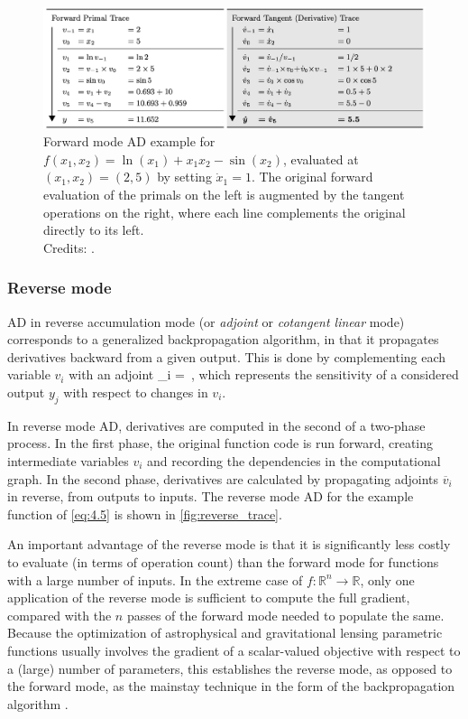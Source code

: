 \begin{figure}
    \centering
    \includegraphics[width=\linewidth]{img//chapter4/forward_trace.png}
    \caption[Forward mode AD example]{Forward mode AD example for $f(x_1, x_2) = \ln{(x_1)} + x_1 x_2 - \sin{(x_2)}$, evaluated at $(x_1, x_2) = (2, 5)$ by setting $\Dot{x}_1 = 1$. The original forward evaluation of the primals on the left is augmented by the tangent operations on the right, where each line complements the original directly to its left.\\\small{Credits: \cite{baydin_automatic_2018}.}}
    \label{fig:forward_trace}
\end{figure}


\subsubsection{Reverse mode}
\label{subsubsec:reverse_mode}
AD in reverse accumulation mode (or \emph{adjoint} or \emph{cotangent linear} mode) \citep{griewank_numerical_2012} corresponds to a generalized backpropagation algorithm, in that it propagates derivatives backward from a given output. This is done by complementing each variable $v_i$ with an adjoint
\be
\label{eq:4.7}
_i =  \,,
\ee
which represents the sensitivity of a considered output $y_j$ with respect to changes in $v_i$.

In reverse mode AD, derivatives are computed in the second of a two-phase process. In the first phase, the original function code is run forward, creating intermediate variables $v_i$ and recording the dependencies in the computational graph. In the second phase, derivatives are calculated by propagating adjoints $\overline{v}_i$ in reverse, from outputs to inputs. The reverse mode AD for the example function of \cref{eq:4.5} is shown in \cref{fig:reverse_trace}.

An important advantage of the reverse mode is that it is significantly less costly to evaluate (in terms of operation count) than the forward mode for functions with a large number of inputs. In the extreme case of $f : \mathbb{R}^n \rightarrow \mathbb{R}$, only one application of the reverse
mode is sufficient to compute the full gradient, compared with the $n$ passes of the forward mode needed to populate the same. Because the optimization of astrophysical and gravitational lensing parametric functions usually involves the gradient of a scalar-valued objective with respect to a (large) number of parameters, this establishes the reverse mode, as opposed to the forward mode, as the mainstay technique in the form of the backpropagation algorithm \citep{schmidhuber_deep_2015}.

